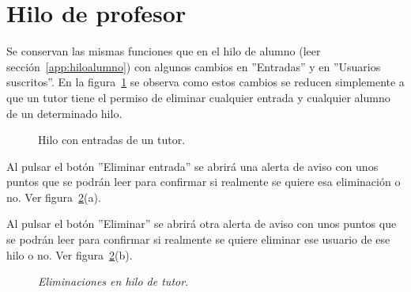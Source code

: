 \documentclass[a4paper, 12pt]{book}
\begin{document}
\section{Hilo de profesor}
Se conservan las mismas funciones que en el hilo de alumno (leer secci\'on~\ref{app:hiloalumno}) con algunos cambios en ''Entradas'' y en ''Usuarios 
suscritos''. En la figura~\ref{figura:hiloprofesor} se observa como estos cambios se reducen simplemente a que un tutor tiene el permiso de eliminar 
cualquier entrada y cualquier alumno de un determinado hilo.
\begin{figure}[htbp] 
  \centering
  \caption{Hilo con entradas de un tutor.}
  \label{figura:hiloprofesor}
\end{figure}

Al pulsar el bot\'on ''Eliminar entrada'' se abrir\'a una alerta de aviso con unos puntos que se podr\'an leer para confirmar si realmente se quiere esa 
eliminaci\'on o no. Ver figura~\ref{figura:hiloprofesor1}(a).

Al pulsar el bot\'on ''Eliminar'' se abrir\'a otra alerta de aviso con unos puntos que se podr\'an leer para confirmar si realmente se quiere eliminar ese
usuario de ese hilo o no. Ver figura~\ref{figura:hiloprofesor1}(b).
\begin{figure}
  \centering
  \caption{\textit{Eliminaciones en hilo de tutor.}}
  \label{figura:hiloprofesor1}
\end{figure}
\end{document}
